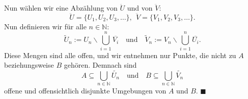 \documentclass[12pt]{scrbook}   %
\newcommand{\qed}{\phantom{.}\hfill{$\blacksquare$}}
\newcommand{\da}{\coloneqq}
\begin{document}
Nun w\"ahlen wir eine Abz\"ahlung von $\ddot U$ und von $\ddot V:$
$$\ddot U = \{U_1,U_2,U_3,\dots\},\ \ \ddot V=\{V_1,V_2,V_3,\dots\}.$$
Nun definieren wir f\"ur alle $n\in \mathbb N:$
$$\widetilde U_n := U_n\smallsetminus\bigcup_{i=1}^n \overline{V_i}\quad\text{und}\quad
\widetilde V_n := V_n\smallsetminus\bigcup_{i=1}^n \overline{U_i}.$$
Diese Mengen sind alle offen, und wir entnehmen nur Punkte, die nicht zu $A$ 
beziehungsweise $B$ geh\"oren. Demnach sind
$$A\subseteq \bigcup_{n\in \mathbb N}\widetilde{U_n}\quad\text{und}\quad 
B\subseteq \bigcup_{n\in \mathbb N}\widetilde{V_n}$$
offene und offensichtlich disjunkte Umgebungen von $A$ und $B$. 
\qed



%

\end{document}
